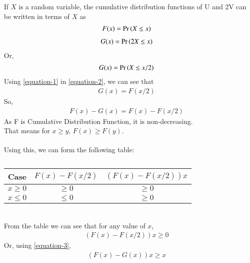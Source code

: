 If $X$ is a random variable, the cumulative distribution functions of U and 2V can be written in terms of $X$ as
\begin{align} \label{equation-1}
    F(x)=\pr{X \leq x} 
\end{align}
\begin{align}
    G(x)=\Pr\left(2X \leq x\right)
\end{align}
Or,
\begin{align} \label{equation-2}
     G(x)=\pr{X \leq x/2}
\end{align}
Using \ref{equation-1} in \ref{equation-2}, we can see that
\begin{align} \label{equation-3}
    G(x)=F(x/2)
\end{align}
So,
\begin{align}
    F(x)-G(x)=F(x)-F(x/2)
\end{align}
As F is Cumulative Distribution Function, it is non-decreasing.\\
That means for $x \geq y$, $F(x) \geq F(y)$.\\ \\
Using this, we can form the following table:
\begin{table}[h!]
    \centering
    \begin{tabular}{|c|c|c|}
        \hline
        Case & $F(x)-F(x/2)$ & $(F(x)-F(x/2))x$ \\
        \hline
        $x \geq 0$ & $\geq 0$ & $\geq 0$ \\
        \hline
        $x \leq 0$ & $\leq 0$ & $\geq 0$ \\
        \hline
    \end{tabular}
    \caption{}
    \label{table-1}
\end{table}\\
From the table we can see that for any value of $x$,
\begin{align}
    (F(x)-F(x/2))x \geq 0
\end{align}
Or, using \ref{equation-3},
\begin{align}
    (F(x)-G(x))x \geq x
\end{align}